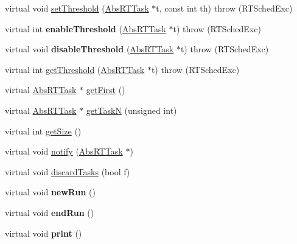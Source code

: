\begin{DoxyCompactItemize}
\item 
virtual void \hyperlink{classRTSim_1_1Scheduler_aa4b543ee23006b91e2585f2fbf97425e}{set\+Threshold} (\hyperlink{classRTSim_1_1AbsRTTask}{Abs\+R\+T\+Task} $\ast$t, const int th)  throw (\+R\+T\+Sched\+Exc)
\item 
virtual int {\bfseries enable\+Threshold} (\hyperlink{classRTSim_1_1AbsRTTask}{Abs\+R\+T\+Task} $\ast$t)  throw (\+R\+T\+Sched\+Exc)\hypertarget{classRTSim_1_1Scheduler_ab39145ac61dd65f0dd6a66e803e50f86}{}\label{classRTSim_1_1Scheduler_ab39145ac61dd65f0dd6a66e803e50f86}

\item 
virtual void {\bfseries disable\+Threshold} (\hyperlink{classRTSim_1_1AbsRTTask}{Abs\+R\+T\+Task} $\ast$t)  throw (\+R\+T\+Sched\+Exc)\hypertarget{classRTSim_1_1Scheduler_aee7c7467073f714d751c9de38e0a18bf}{}\label{classRTSim_1_1Scheduler_aee7c7467073f714d751c9de38e0a18bf}

\item 
virtual int \hyperlink{classRTSim_1_1Scheduler_aac127a1883f17751075f995133804605}{get\+Threshold} (\hyperlink{classRTSim_1_1AbsRTTask}{Abs\+R\+T\+Task} $\ast$t)  throw (\+R\+T\+Sched\+Exc)
\item 
virtual \hyperlink{classRTSim_1_1AbsRTTask}{Abs\+R\+T\+Task} $\ast$ \hyperlink{classRTSim_1_1Scheduler_a7f975c81e7e1e82cf4106a53afc9fd33}{get\+First} ()
\item 
virtual \hyperlink{classRTSim_1_1AbsRTTask}{Abs\+R\+T\+Task} $\ast$ \hyperlink{classRTSim_1_1Scheduler_a340bb189d3153cf5fc88fcec8f1319a7}{get\+TaskN} (unsigned int)
\item 
virtual int \hyperlink{classRTSim_1_1Scheduler_a0469b37ca1d71055dff06832a61042aa}{get\+Size} ()
\item 
virtual void \hyperlink{classRTSim_1_1Scheduler_a96cd49d8e2d164ad2fa064b0998065d5}{notify} (\hyperlink{classRTSim_1_1AbsRTTask}{Abs\+R\+T\+Task} $\ast$)
\item 
virtual void \hyperlink{classRTSim_1_1Scheduler_aeeb3c2d60e5a28dee195465f2bdfed3b}{discard\+Tasks} (bool f)
\item 
virtual void {\bfseries new\+Run} ()\hypertarget{classRTSim_1_1Scheduler_ab61d7ac7e494e3130ae795fb55640161}{}\label{classRTSim_1_1Scheduler_ab61d7ac7e494e3130ae795fb55640161}

\item 
virtual void {\bfseries end\+Run} ()\hypertarget{classRTSim_1_1Scheduler_a04ad029d10466b272c0947accf7dee65}{}\label{classRTSim_1_1Scheduler_a04ad029d10466b272c0947accf7dee65}

\item 
virtual void {\bfseries print} ()\hypertarget{classRTSim_1_1Scheduler_a0ddf60d18535d4ebf4470484770a9f3b}{}\label{classRTSim_1_1Scheduler_a0ddf60d18535d4ebf4470484770a9f3b}

\end{DoxyCompactItemize}
